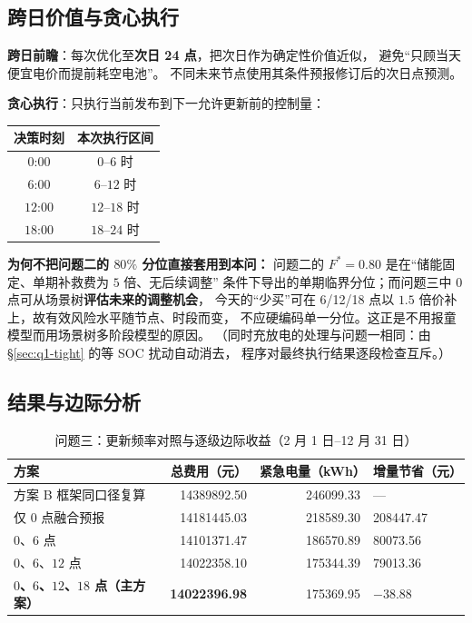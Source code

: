 \subsection{跨日价值与贪心执行}

\textbf{跨日前瞻}：每次优化至\textbf{次日 24 点}，把次日作为确定性价值近似，
避免“只顾当天便宜电价而提前耗空电池”。
不同未来节点使用其条件预报修订后的次日点预测。

\textbf{贪心执行}：只执行当前发布到下一允许更新前的控制量：

\begin{center}
\begin{tabular}{@{}c c@{}}
\toprule
决策时刻 & 本次执行区间 \\
\midrule
$0$:00  & $0$--$6$ 时 \\
$6$:00  & $6$--$12$ 时 \\
$12$:00 & $12$--$18$ 时 \\
$18$:00 & $18$--$24$ 时 \\
\bottomrule
\end{tabular}
\end{center}

\noindent\textbf{为何不把问题二的 $80\%$ 分位直接套用到本问：}
问题二的 $F^*=0.80$ 是在“储能固定、单期补救费为 $5$ 倍、无后续调整”
条件下导出的单期临界分位；而问题三中 0 点可从场景树\textbf{评估未来的调整机会}，
今天的“少买”可在 6/12/18 点以 $1.5$ 倍价补上，故有效风险水平随节点、时段而变，
不应硬编码单一分位。这正是不用报童模型而用场景树多阶段模型的原因。
（同时充放电的处理与问题一相同：由 \S\ref{sec:q1-tight} 的等 SOC 扰动自动消去，
程序对最终执行结果逐段检查互斥。）

\subsection{结果与边际分析}

\begin{table}[H]
\centering
\caption{问题三：更新频率对照与逐级边际收益（2 月 1 日--12 月 31 日）}
\label{tab:q3-abl}
\begin{tabular}{@{}l r r l@{}} 
\toprule
方案 & {总费用（元）} & {紧急电量（kWh）} & {增量节省（元）} \\
\midrule
方案 B 框架同口径复算 & 14389892.50 & 246099.33 & — \\
仅 0 点融合预报       & 14181445.03 & 218589.30 & 208447.47 \\
$0$、$6$ 点           & 14101371.47 & 186570.89 & 80073.56 \\
$0$、$6$、$12$ 点     & 14022358.10 & 175344.39 & 79013.36 \\
\textbf{$0$、$6$、$12$、$18$ 点（主方案）} & \bfseries 14022396.98 & 175369.95 & $-38.88$ \\
\bottomrule
\end{tabular}
\end{table}

